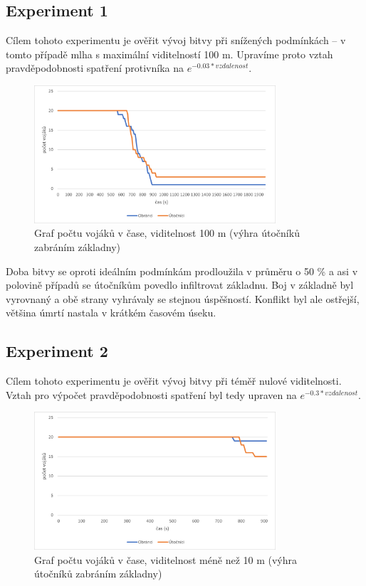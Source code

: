 \documentclass[a4paper, 11pt]{article}
\begin{document}
    \subsection{Experiment 1}
    Cílem tohoto experimentu je ověřit vývoj bitvy při snížených podmínkách -- v tomto případě mlha s maximální viditelností 100 m. Upravíme proto vztah pravděpodobnosti spatření protivníka na $e^{-0.03 * vzdalenost}$.
    \begin{figure}[h]
        \centering
        \includegraphics[width=0.8\textwidth]{graph2.png}
        \caption{Graf počtu vojáků v čase, viditelnost 100 m (výhra útočníků zabráním základny)}
    \end{figure}

    Doba bitvy se oproti ideálním podmínkám prodloužila v průměru o 50 \% a asi v polovině případů se útočníkům povedlo infiltrovat základnu. Boj v základně byl vyrovnaný a obě strany vyhrávaly se stejnou úspěšností. Konflikt byl ale ostřejší, většina úmrtí nastala v krátkém časovém úseku.

    \subsection{Experiment 2}
    Cílem tohoto experimentu je ověřit vývoj bitvy při téměř nulové viditelnosti. Vztah pro výpočet pravděpodobnosti spatření byl tedy upraven na $e^{-0.3 * vzdalenost}$.
    \begin{figure}[h]
        \centering
        \includegraphics[width=0.8\textwidth]{graph3.png}
        \caption{Graf počtu vojáků v čase, viditelnost méně než 10 m (výhra útočníků zabráním základny)}
    \end{figure}
\end{document}
